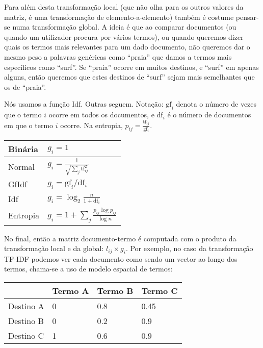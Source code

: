 \documentclass[twocolumn]{article}
\begin{document}
Para além desta transformação local (que não olha para os outros valores da matriz, é uma transformação de elemento-a-elemento) também é costume pensar-se numa transformação global. A ideia é que ao comparar documentos (ou quando um utilizador procura por vários termos), ou quando queremos dizer quais os termos mais relevantes para um dado documento, não queremos dar o mesmo peso a palavras genéricas como ``praia'' que damos a termos mais específicos como ``surf''. Se ``praia'' ocorre em muitos destinos, e ``surf'' em apenas alguns, então queremos que estes destinos de ``surf'' sejam mais semelhantes que os de ``praia''.

Nós usamos a função Idf. Outras seguem. Notação: $\mathrm{gf}_i$ denota o número de vezes que o termo $i$ ocorre em todos os documentos, e $\mathrm{df}_i$ é o número de documentos em que o termo $i$ ocorre. Na entropia, $p_{ij}=\frac{\mathrm{tf}_{ij}}{\mathrm{gf}_i}$.

\noindent
\begin{center}
\begin{tabular}{|l|l|}
\hline
	Binária & $g_i=1$ \\\hline
	Normal & $g_i=\frac{1}{\sqrt{\sum_j\mathrm{tf}_{ij}^2}}$ \\\hline
	GfIdf & $g_i=\mathrm{gf}_i/\mathrm{df}_i$ \\\hline
	Idf & $g_i=\log_2 \frac{n}{1+\mathrm{df}_i}$ \\\hline
	Entropia & $g_i=1+\sum_j \frac{p_{ij}\log p_{ij}}{\log n}$ \\\hline
\end{tabular}
\end{center}

No final, então a matriz documento-termo é computada com o produto da transformação local e da global: $l_{ij} \times g_i$. Por exemplo, no caso da transformação TF-IDF podemos ver cada documento como sendo um vector ao longo dos termos, chama-se a uso de modelo espacial de termos:

\noindent
\begin{center}
\begin{tabular}{|l|l|l|l|}
\hline
	& Termo A & Termo B & Termo C \\\hline
	Destino A & 0 & 0.8 & 0.45 \\\hline
	Destino B & 0 & 0.2 & 0.9 \\\hline
	Destino C & 1 & 0.6 & 0.9 \\\hline
\end{tabular}
\end{center}
\end{document}
